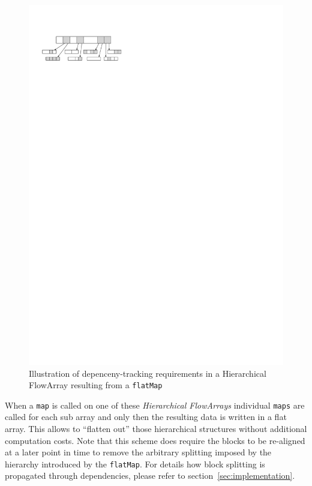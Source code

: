 \documentclass[runningheads,a4paper,fleqn]{llncs}
\begin{document}
\begin{figure}
  \centering
  \includegraphics{flatMap-dependency}
  \caption{Illustration of depenceny-tracking requirements in a
    Hierarchical FlowArray resulting from a \texttt{flatMap}}
  \label{fig:flatMap-dependency}
\end{figure}

When a \texttt{map} is called on one of these \emph{Hierarchical
  FlowArrays} individual \texttt{maps} are called for each sub array
and only then the resulting data is written in a flat array. This
allows to ``flatten out'' those hierarchical structures without
additional computation costs. Note that this scheme does require the
blocks to be re-aligned at a later point in time to remove the
arbitrary splitting imposed by the hierarchy introduced by the
\texttt{flatMap}. For details how block splitting is propagated
through dependencies, please refer to
section~\ref{sec:implementation}.
\end{document}
